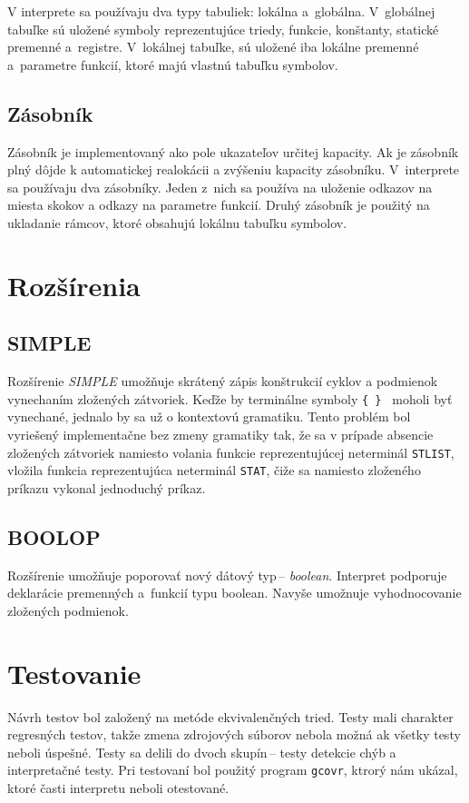 \documentclass[11pt,a4paper]{article}
\begin{document}
        V interprete sa používaju dva typy tabuliek: lokálna a~globálna. V~globálnej tabuľke sú uložené symboly reprezentujúce
        triedy, funkcie, konštanty, statické premenné a~registre. V~lokálnej tabuľke, sú uložené iba lokálne premenné a~parametre
        funkcií, ktoré majú vlastnú tabuľku symbolov.

        \subsection{Zásobník}
        Zásobník je implementovaný ako pole ukazateľov určitej kapacity. Ak je zásobník plný dôjde
        k automatickej realokácii a zvýšeniu kapacity zásobníku. V~interprete sa používaju dva zásobníky. Jeden z~nich
        sa používa na uloženie odkazov na miesta skokov a odkazy na parametre funkcií. Druhý zásobník je použitý na ukladanie
        rámcov, ktoré obsahujú lokálnu tabuľku symbolov.

\section{Rozšírenia} 
\label{rozsirenia}

    \subsection{SIMPLE}
    Rozšírenie \emph{SIMPLE} umožňuje skrátený zápis konštrukcií cyklov a podmienok vynechaním zložených zátvoriek. Keďže by terminálne symboly
    \texttt{\{ \} } moholi byť vynechané, jednalo by sa už o kontextovú gramatiku. Tento problém bol vyriešený implementačne bez zmeny
    gramatiky tak, že sa v prípade absencie zložených zátvoriek namiesto volania funkcie reprezentujúcej neterminál \texttt{STLIST}, vložila
    funkcia reprezentujúca neterminál \texttt{STAT}, čiže sa namiesto zloženého príkazu vykonal jednoduchý príkaz.

    \subsection{BOOLOP}
    Rozšírenie umožňuje poporovať nový dátový typ\,-- \emph{boolean}. Interpret podporuje deklarácie premenných a~funkcií typu boolean. Navyše
    umožnuje vyhodnocovanie zložených podmienok.

\section{Testovanie} 
\label{testovanie}
Návrh testov bol založený na metóde ekvivalenčných tried. Testy mali charakter regresných testov, takže zmena zdrojových súborov nebola možná ak
všetky testy neboli úspešné. Testy sa delili do dvoch skupín\,-- testy detekcie chýb a interpretačné testy. Pri testovaní bol použitý program
\texttt{gcovr}, ktrorý nám ukázal, ktoré časti interpretu neboli otestované.
\end{document}
